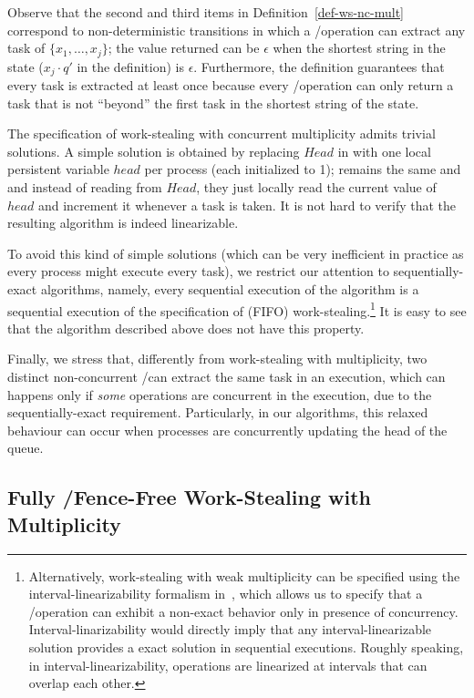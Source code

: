 Observe that the second and third items in Definition~\ref{def-ws-nc-mult} correspond to non-deterministic transitions in which a \Take/\Steal operation can extract any task of \(\{x_1, \hdots, x_j\}\); the value returned can be \(\epsilon\) when the shortest string in the state (\(x_j \cdot q'\) in the definition) is \(\epsilon\).  Furthermore, the definition guarantees that every task is extracted at least once because every \Take/\Steal operation can only return a task that is not ``beyond'' the first task in the shortest string of the state.

The specification of work-stealing with concurrent multiplicity admits trivial solutions.  A simple solution is obtained by replacing \(Head\) in \WFWSM with one local persistent variable \(head\) per process (each initialized to 1); \Put remains the same and \Take and \Steal instead of reading from \(Head\), they just locally read the current value of \(head\) and increment it whenever a task is taken. It is not hard to verify that the resulting algorithm is indeed linearizable.

To avoid this kind of simple solutions (which can be very inefficient in practice as every process might execute every task), we restrict our attention to sequentially-exact algorithms, namely, every sequential execution of the algorithm is a sequential execution of the specification of (FIFO) work-stealing.\footnote{Alternatively, work-stealing with weak multiplicity can be specified using the interval-linearizability formalism in~\cite{DBLP_journals_jacm_CastanedaRR18}, which allows us to specify that a \Take/\Steal operation can exhibit a non-exact behavior only in presence of concurrency. Interval-linarizability would directly imply that any interval-linearizable solution provides a exact solution in sequential executions.  Roughly speaking, in interval-linearizability, operations are linearized at intervals that can overlap each other.}  It is easy to see that the algorithm described above does not have this property.

Finally, we stress that, differently from work-stealing with multiplicity, two distinct non-concurrent \Take/\Steal can extract the same task in an execution, which can happens only if \emph{some} operations are concurrent in the execution, due to the sequentially-exact requirement.  Particularly, in our algorithms, this relaxed behaviour can occur when processes are concurrently updating the head of the queue.


\subsection{\label{sec-ws-mult-read-write} Fully \R/\W Fence-Free  Work-Stealing with Multiplicity}


